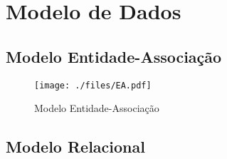 %
%
\chapter{Modelo de Dados} \label{cap3}
\section{Modelo Entidade-Associação}\label{sec31}
\begin{figure}
	\centering
	\texttt{[image: ./files/EA.pdf]}
	\caption{Modelo Entidade-Associação}
	\label{modelo-ea}
	
\end{figure}

\section{Modelo Relacional}\label{sec32}


